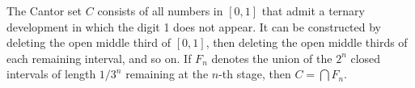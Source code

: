 The Cantor set $C$ consists of all numbers in $[0, 1]$ that admit a ternary development in which the digit 1 does not appear. It can be constructed by deleting the open middle third of $[0, 1]$, then deleting the open middle thirds of each remaining interval, and so on. If $F_n$ denotes the union of the $2^n$ closed intervals of length $1/3^n$ remaining at the $n$-th stage, then $C = \bigcap F_n$.

